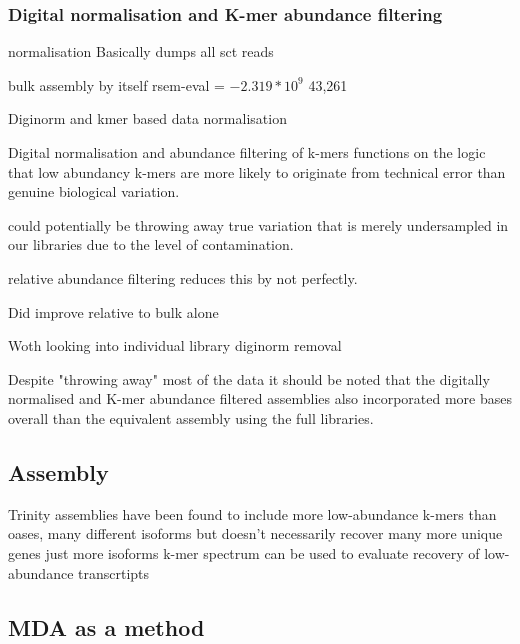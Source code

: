 \subsubsection{Digital normalisation and K-mer abundance filtering}
normalisation
Basically dumps all sct reads


bulk assembly by itself 
rsem-eval = \(-2.319*10^9\) 43,261




Diginorm and kmer based data normalisation 

Digital normalisation and abundance filtering of k-mers functions on the logic 
that low abundancy k-mers are more likely to originate from technical error
than genuine biological variation.

could potentially be throwing away true variation that is merely undersampled
in our libraries due to the level of contamination.

relative abundance filtering reduces this by not perfectly.

Did improve relative to bulk alone

Woth looking into individual library diginorm removal



Despite "throwing away" most of the data it should be noted
that the digitally normalised and K-mer abundance filtered assemblies also
incorporated more bases overall than the equivalent assembly using the full
libraries. 



\subsection{Assembly}

Trinity assemblies have been found to include more low-abundance k-mers than oases, many different isoforms
but doesn't necessarily recover many more unique genes just more isoforms \citep{Lowe2014} 
k-mer spectrum can be used to evaluate recovery of low-abundance transcrtipts \citep{Pop2009}


    

\subsection{MDA as a method}





